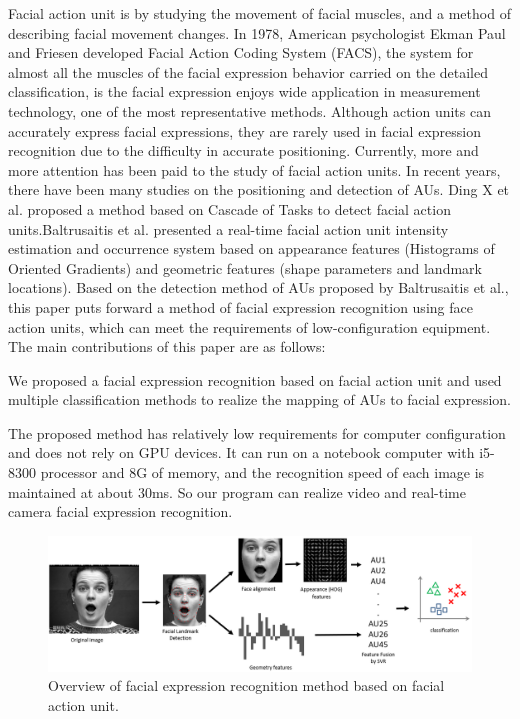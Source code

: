 \documentclass[10pt, conference, compsocconf]{IEEEtran}
\begin{document}
Facial action unit is by studying the movement of facial muscles\cite{Hager1985A}, and a method of describing facial movement changes. In 1978, American psychologist Ekman Paul and Friesen\cite{friesen1978facial} developed Facial Action Coding System (FACS), the system for almost all the muscles of the facial expression behavior carried on the detailed classification, is the facial expression enjoys wide application in measurement technology, one of the most representative methods. Although action units can accurately express facial expressions, they are rarely used in facial expression recognition due to the difficulty in accurate positioning. Currently, more and more attention has been paid to the study of facial action units. In recent years, there have been many studies on the positioning and detection of AUs. Ding X\cite{Ding2013Facial} et al. proposed a method based on Cascade of Tasks to detect facial action units.Baltrusaitis\cite{Baltrusaitis2015Cross} et al. presented a real-time facial action unit intensity estimation and occurrence system based on appearance features (Histograms of Oriented Gradients) and geometric features (shape parameters and landmark locations). Based on the detection method of AUs proposed by Baltrusaitis et al., this paper puts forward a method of facial expression recognition using face action units, which can meet the requirements of low-configuration equipment. The main contributions of this paper are as follows:

We proposed a facial expression recognition based on facial action unit and used multiple classification methods to realize the mapping of AUs to facial expression.

The proposed method has relatively low requirements for computer configuration and does not rely on GPU devices. It can run on a notebook computer with i5-8300 processor and 8G of memory, and the recognition speed of each image is maintained at about 30ms. So our program can realize video and real-time camera facial expression recognition.

\begin{figure}[h]
	\centering
	\includegraphics[width=\textwidth]{framework}
	\caption{Overview of facial expression recognition method based on facial action unit.}
\end{figure}
\end{document}
